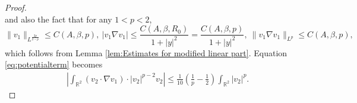 \documentclass[12pt]{amsart}
\numberwithin{equation}{section}              %
\theoremstyle{remark}
\begin{document}
\begin{proof}
\begin{equation*}
			\end{equation*}
			and also the fact that for any $1<p<2$,
			\begin{equation*}
				\| v_1\|_{L^{\frac{2p}{2-p}}} \leq C(A,\beta, p), ~	| v_1\nabla  v_1|\leq \frac{C(A,\beta, R_0)}{1+|y|^2}=\frac{C(A,\beta, p)}{1+|y|^2}, ~\| v_1 \nabla  v_1\|_{L^{p}}\leq C(A,\beta, p),
			\end{equation*}
			which follows from Lemma \ref{lem:Estimates for modified linear part}.
			Equation \eqref{eq:potentialterm} becomes 
			\begin{equation}\label{eq:potentialterm1}
				\begin{aligned}
					&\left|\int_{\mathbb{R}^2}	(v_2\cdot\nabla  v_1) \cdot |v_2|^{p-2}v_2\right|\leq \frac{1}{10} \left(\frac{1}{p}-\frac{1}{2}\right) \int_{\mathbb{R}^2} |v_2|^{p}.
				\end{aligned}
			\end{equation}
            

\end{proof}
\end{document}
